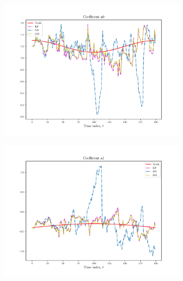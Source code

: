 \documentclass{article}
\begin{document}
\begin{figure}
    \begin{subfigure}{.5\textwidth}
        \includegraphics[width=1.15\textwidth]{Figures/coefficient_a0.pdf}
    \end{subfigure}
    \begin{subfigure}{.5\textwidth}
        \includegraphics[width=1.15\textwidth]{Figures/coefficient_a1.pdf}
    \end{subfigure}


\end{figure}
\end{document}

